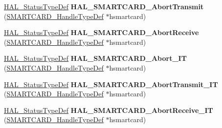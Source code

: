 \begin{DoxyCompactItemize}
\hyperlink{stm32f0xx__hal__def_8h_a63c0679d1cb8b8c684fbb0632743478f}{H\+A\+L\+\_\+\+Status\+Type\+Def} {\bfseries H\+A\+L\+\_\+\+S\+M\+A\+R\+T\+C\+A\+R\+D\+\_\+\+Abort\+Transmit} (\hyperlink{struct_s_m_a_r_t_c_a_r_d___handle_type_def}{S\+M\+A\+R\+T\+C\+A\+R\+D\+\_\+\+Handle\+Type\+Def} $\ast$hsmartcard)
\item 
\mbox{\label{group___s_m_a_r_t_c_a_r_d___exported___functions___group2_ga8114ab4742e16ea8dd2f8f13bca35166}} 
\hyperlink{stm32f0xx__hal__def_8h_a63c0679d1cb8b8c684fbb0632743478f}{H\+A\+L\+\_\+\+Status\+Type\+Def} {\bfseries H\+A\+L\+\_\+\+S\+M\+A\+R\+T\+C\+A\+R\+D\+\_\+\+Abort\+Receive} (\hyperlink{struct_s_m_a_r_t_c_a_r_d___handle_type_def}{S\+M\+A\+R\+T\+C\+A\+R\+D\+\_\+\+Handle\+Type\+Def} $\ast$hsmartcard)
\item 
\mbox{\label{group___s_m_a_r_t_c_a_r_d___exported___functions___group2_ga1e498821b44eac06aba2feb772795f22}} 
\hyperlink{stm32f0xx__hal__def_8h_a63c0679d1cb8b8c684fbb0632743478f}{H\+A\+L\+\_\+\+Status\+Type\+Def} {\bfseries H\+A\+L\+\_\+\+S\+M\+A\+R\+T\+C\+A\+R\+D\+\_\+\+Abort\+\_\+\+IT} (\hyperlink{struct_s_m_a_r_t_c_a_r_d___handle_type_def}{S\+M\+A\+R\+T\+C\+A\+R\+D\+\_\+\+Handle\+Type\+Def} $\ast$hsmartcard)
\item 
\mbox{\label{group___s_m_a_r_t_c_a_r_d___exported___functions___group2_gad5efa16891d71dbabac7b85903850540}} 
\hyperlink{stm32f0xx__hal__def_8h_a63c0679d1cb8b8c684fbb0632743478f}{H\+A\+L\+\_\+\+Status\+Type\+Def} {\bfseries H\+A\+L\+\_\+\+S\+M\+A\+R\+T\+C\+A\+R\+D\+\_\+\+Abort\+Transmit\+\_\+\+IT} (\hyperlink{struct_s_m_a_r_t_c_a_r_d___handle_type_def}{S\+M\+A\+R\+T\+C\+A\+R\+D\+\_\+\+Handle\+Type\+Def} $\ast$hsmartcard)
\item 
\mbox{\label{group___s_m_a_r_t_c_a_r_d___exported___functions___group2_gac7b4a39a5803372849bdb7e2a73bf072}} 
\hyperlink{stm32f0xx__hal__def_8h_a63c0679d1cb8b8c684fbb0632743478f}{H\+A\+L\+\_\+\+Status\+Type\+Def} {\bfseries H\+A\+L\+\_\+\+S\+M\+A\+R\+T\+C\+A\+R\+D\+\_\+\+Abort\+Receive\+\_\+\+IT} (\hyperlink{struct_s_m_a_r_t_c_a_r_d___handle_type_def}{S\+M\+A\+R\+T\+C\+A\+R\+D\+\_\+\+Handle\+Type\+Def} $\ast$hsmartcard)
\item 

\end{DoxyCompactItemize}
